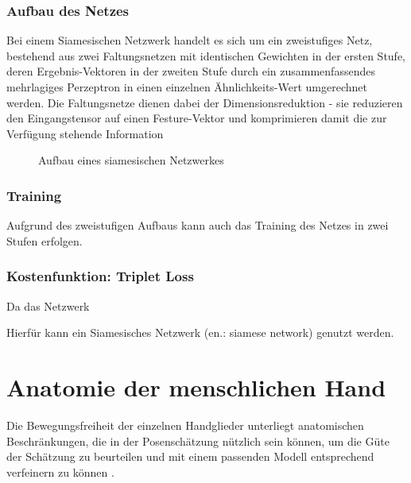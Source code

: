 	\subsubsection{Aufbau des Netzes}
	 Bei einem Siamesischen Netzwerk handelt es sich um ein zweistufiges Netz, bestehend aus zwei Faltungsnetzen mit identischen Gewichten in der ersten Stufe, deren Ergebnis-Vektoren in der zweiten Stufe durch ein zusammenfassendes mehrlagiges Perzeptron in einen einzelnen Ähnlichkeits-Wert umgerechnet werden.
	 Die Faltungsnetze dienen dabei der Dimensionsreduktion - sie reduzieren den Eingangstensor auf einen Festure-Vektor und komprimieren damit die zur Verfügung stehende Information 
	 
	 
	 
	 \begin{figure}
	 	\centering
	 	
	 	\caption{Aufbau eines siamesischen Netzwerkes}
	 	\label{fig:siamesenetwork}
	 \end{figure}
	 
	 
	 \subsubsection{Training}
	 Aufgrund des zweistufigen Aufbaus kann auch das Training des Netzes in zwei Stufen erfolgen.
	 
	 \subsubsection{Kostenfunktion: Triplet Loss}
	 Da das Netzwerk 
	 

	
	Hierfür kann ein Siamesisches Netzwerk (en.: siamese network) genutzt werden. 
	
\section { Anatomie der menschlichen Hand }
	Die Bewegungsfreiheit der einzelnen Handglieder unterliegt anatomischen Beschränkungen, die in der Posenschätzung nützlich sein können, um die Güte der Schätzung zu beurteilen und mit einem passenden Modell entsprechend verfeinern zu können \cite{Melax5222017}.
	
